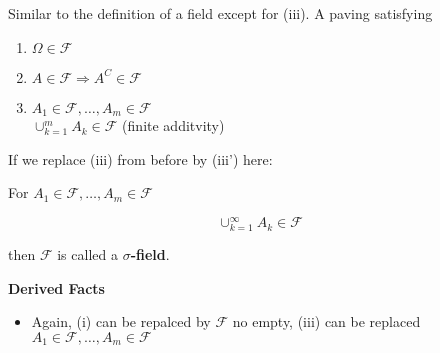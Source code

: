 \documentclass[11pt,fleqn]{book} %
\begin{document}
\begin{definition} Similar to the definition of a field except for (iii). A paving satisfying 
	\begin{enumerate}[label = (\roman*)]
		\item $\Omega \in \mathscr{F}$
		\item $A \in \mathscr{F} \Rightarrow A^C \in \mathscr{F}$
		\item $A_1 \in \mathscr{F}, \dots, A_m \in \mathscr{F} $\\ $\displaystyle\cup_{k=1}^m A_k \in \mathscr{F}$ (finite additvity)
	\end{enumerate}
\vspace{5mm}

If we replace (iii) from before by (iii') here:

For $A_1 \in \mathscr{F}, \dots, A_m \in \mathscr{F}$ 

$$\cup_{k=1}^\infty A_k \in \mathscr{F}$$

then $\mathscr{F}$ is called a $\sigma$\textbf{-field}. 
\end{definition}


	


\textbf{Derived Facts}

\begin{itemize}
	\item Again, (i) can be repalced by $\mathscr{F}$ no empty, 
				(iii) can be replaced  $A_1 \in \mathscr{F}, \dots, A_m \in \mathscr{F} $
\end{itemize}
\end{document}

